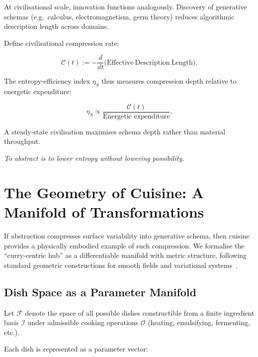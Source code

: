 \documentclass[12pt,a4paper]{article}
\theoremstyle{definition}
\begin{document}
At civilisational scale, innovation functions analogously.
Discovery of generative schemas (e.g.\ calculus, electromagnetism,
germ theory) reduces algorithmic description length across domains.

Define civilisational compression rate:

\begin{equation}
  \mathcal{C}(t)
  :=
  -\frac{d}{dt}
  \big(
    \mathrm{Effective\ Description\ Length}
  \big).
\end{equation}

The entropy-efficiency index $\eta_S$ thus measures compression depth
relative to energetic expenditure:

\begin{equation}
  \eta_S \propto
  \frac{\mathcal{C}(t)}{\text{Energetic expenditure}}.
\end{equation}

A steady-state civilisation maximises schema depth rather than material throughput.

\medskip
\begin{center}
  \itshape
  To abstract is to lower entropy without lowering possibility.
\end{center}

\section{The Geometry of Cuisine: A Manifold of Transformations}
\label{sec:curry_manifold}

If abstraction compresses surface variability into generative schema,
then cuisine provides a physically embodied example of such compression.
We formalise the ``curry-centric hub'' as a differentiable manifold
with metric structure, following standard geometric constructions
for smooth fields and variational systems~\citep{evans2010}.

\subsection{Dish Space as a Parameter Manifold}

Let $\mathcal{F}$ denote the space of all possible dishes constructible
from a finite ingredient basis $\mathcal{I}$ under admissible cooking
operations $\mathcal{O}$ (heating, emulsifying, fermenting, etc.).

Each dish is represented as a parameter vector:
\end{document}
